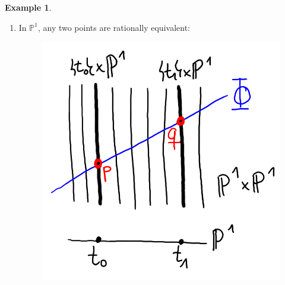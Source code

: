 \documentclass[12pt,a4paper]{amsart}
\theoremstyle{plain}
\theoremstyle{definition}
\newtheorem{exmp}[thm]{Example}
\theoremstyle{remark}
\begin{document}
\begin{exmp}\mbox{ }
    \begin{enumerate}
	\item In $\mathbb{P}^{1}$, any two points are rationally equivalent:
	    \begin{figure}[H]
		\centering
		\includegraphics[scale=.2]{pictures/points}
	    \end{figure}


\end{enumerate}
\end{exmp}
\end{document}
